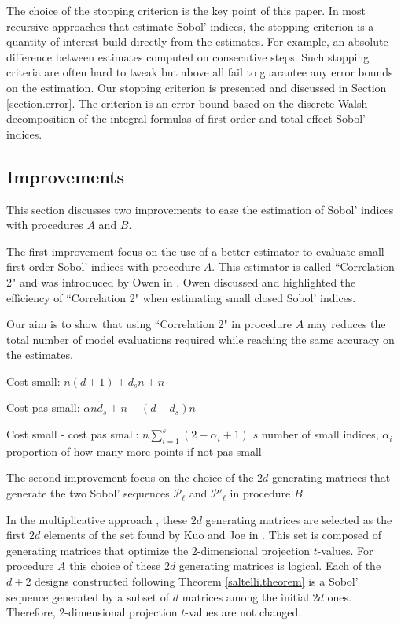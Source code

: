 \documentclass[]{elsarticle}
\theoremstyle{definition}
\begin{document}
The choice of the stopping criterion is the key point of this paper. In most recursive approaches that estimate Sobol' indices, the stopping criterion is a quantity of interest build directly from the estimates. For example, an absolute difference between estimates computed on consecutive steps. Such stopping criteria are often hard to tweak but above all fail to guarantee any error bounds on the estimation. Our stopping criterion is presented and discussed in Section \ref{section.error}. The criterion is an error bound based on the discrete Walsh decomposition of the integral formulas of first-order and total effect Sobol' indices. 

\subsection{Improvements}
This section discusses two improvements to ease the estimation of Sobol' indices with procedures $A$ and $B$.

\bigskip

The first improvement focus on the use of a better estimator to evaluate small first-order Sobol' indices with procedure $A$. This estimator is called ``Correlation 2" and was introduced by Owen in \cite{Owen}. Owen discussed and highlighted the efficiency of ``Correlation 2" when estimating small closed Sobol' indices. 

Our aim is to show that using ``Correlation 2" in procedure $A$ may reduces the total number of model evaluations required while reaching the same accuracy on the estimates.


Cost small: $n(d+1)+d_sn+n$

Cost pas small: $\alpha n d_s +n+(d-d_s)n$

Cost small - cost pas small: $n\sum_{i=1}^{s}(2-\alpha_i+1)$ $s$ number of small indices, $\alpha_i$ proportion of how many more points if not pas small

\bigskip

The second improvement focus on the choice of the $2d$ generating matrices that generate the two Sobol' sequences $\mathcal{P}_\ell$  and ${\mathcal{P}'}_\ell$ in procedure $B$.

In the multiplicative approach \cite{crass}, these $2d$ generating matrices are selected as the first $2d$ elements of the set found by Kuo and Joe in \cite{Kuo}. This set is composed of generating matrices that optimize the $2$-dimensional projection $t$-values. For procedure $A$ this choice of these $2d$ generating matrices is logical. Each of the $d+2$ designs constructed following Theorem \ref{saltelli.theorem} is a Sobol' sequence generated by a subset of $d$ matrices among the initial $2d$ ones. Therefore, $2$-dimensional projection $t$-values are not changed. 
\end{document}
